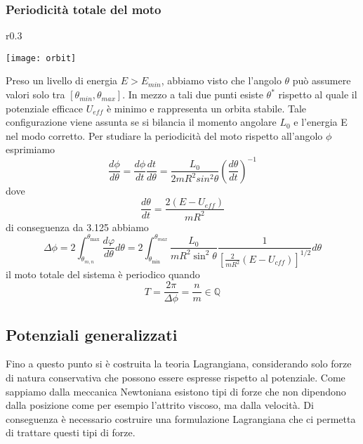 \subsubsection{Periodicit\`{a} totale del moto}
\begin{wrapfigure}[5]{r}{0.3\textwidth}
\vspace{-1.2in}
  \begin{center}
    \texttt{[image: orbit]}
  \end{center}
\end{wrapfigure}
Preso un livello di energia $E > E_{min}$, abbiamo visto che l'angolo $\theta $ pu\`{o} assumere valori solo tra $[\theta_{min},\theta_{max}]$. In mezzo a tali due punti esiste $\theta^*$ rispetto al quale il potenziale efficace $U_{eff}$ \`{e} minimo e rappresenta un orbita stabile. Tale configurazione viene assunta se si bilancia il momento angolare $L_0$ e l'energia E nel modo corretto. 
\newline
\noindent Per studiare la periodicit\`{a} del moto rispetto all'angolo $\phi$ esprimiamo 
\begin{equation}
	\frac{d \phi}{d \theta} = \frac{d \phi}{dt} \frac{dt}{d \theta} = \frac{L_0}{2mR^2sin^2\theta} \left (\frac{d\theta}{dt} \right )^{-1}
\end{equation}
dove 
\begin{equation*}
	\frac{d\theta}{dt} = \frac{2(E-U_{eff})}{mR^2}
\end{equation*}
di conseguenza da 3.125 abbiamo
\begin{equation}
\Delta \phi=2 \int_{\theta_{m, n}}^{\theta_{\max }} \frac{d \varphi}{d \theta} d \theta=2 \int_{\theta_{\min }}^{\theta_{m a x}} \frac{L_0}{m R^2 \sin ^2 \theta} \frac{1}{\left[\frac{2}{m R^2}\left(E-U_{c f f}\right)\right]^{1 / 2}} d \theta
\end{equation}
il moto totale del sistema \`{e} periodico quando 
\begin{equation}
	T = \frac{2 \pi}{\Delta \phi} = \frac{n}{m} \in \mathbb{Q}
\end{equation}

\subsection{Potenziali generalizzati}

Fino a questo punto si \`{e} costruita la teoria Lagrangiana, considerando  solo forze di natura conservativa che possono essere espresse rispetto al potenziale. Come sappiamo dalla meccanica Newtoniana esistono tipi di forze che non dipendono dalla posizione come per esempio l'attrito viscoso, ma dalla velocit\`{a}. Di conseguenza \`{e} necessario costruire una formulazione Lagrangiana che ci permetta di trattare questi tipi di forze.
\newline

